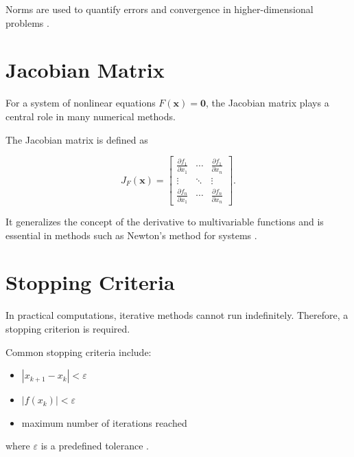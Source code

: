 Norms are used to quantify errors and convergence in higher-dimensional problems \cite{atkinson}.

\section{Jacobian Matrix}

For a system of nonlinear equations \( F(\mathbf{x}) = \mathbf{0} \), the Jacobian matrix plays a central role in many numerical methods.

The Jacobian matrix is defined as

\begin{equation}
J_F(\mathbf{x}) =
\begin{bmatrix}
\frac{\partial f_1}{\partial x_1} & \cdots & \frac{\partial f_1}{\partial x_n} \\
\vdots & \ddots & \vdots \\
\frac{\partial f_n}{\partial x_1} & \cdots & \frac{\partial f_n}{\partial x_n}
\end{bmatrix}.
\end{equation}

It generalizes the concept of the derivative to multivariable functions and is essential in methods such as Newton’s method for systems \cite{kelley}.

\section{Stopping Criteria}

In practical computations, iterative methods cannot run indefinitely. Therefore, a stopping criterion is required.

Common stopping criteria include:
\begin{itemize}
    \item \( |x_{k+1} - x_k| < \varepsilon \)
    \item \( |f(x_k)| < \varepsilon \)
    \item maximum number of iterations reached
\end{itemize}

where \( \varepsilon \) is a predefined tolerance \cite{burden, cs357}.